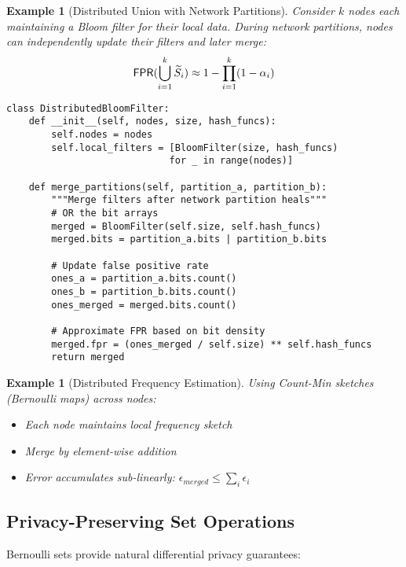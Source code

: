 \documentclass[11pt,final,hidelinks]{article}
\newtheorem{example}[theorem]{Example}
\newcommand{\ASet}[1]{\obs{#1}}  %
\begin{document}
\begin{example}[Distributed Union with Network Partitions]
Consider $k$ nodes each maintaining a Bloom filter for their local data. During network partitions, nodes can independently update their filters and later merge:
\begin{equation}
\FPR(\bigcup_{i=1}^k \ASet{S}_i) \approx 1 - \prod_{i=1}^k (1 - \fprate_i)
\end{equation}

\begin{verbatim}
class DistributedBloomFilter:
    def __init__(self, nodes, size, hash_funcs):
        self.nodes = nodes
        self.local_filters = [BloomFilter(size, hash_funcs) 
                             for _ in range(nodes)]
    
    def merge_partitions(self, partition_a, partition_b):
        """Merge filters after network partition heals"""
        # OR the bit arrays
        merged = BloomFilter(self.size, self.hash_funcs)
        merged.bits = partition_a.bits | partition_b.bits
        
        # Update false positive rate
        ones_a = partition_a.bits.count()
        ones_b = partition_b.bits.count()
        ones_merged = merged.bits.count()
        
        # Approximate FPR based on bit density
        merged.fpr = (ones_merged / self.size) ** self.hash_funcs
        return merged
\end{verbatim}
\end{example}

\begin{example}[Distributed Frequency Estimation]
Using Count-Min sketches (Bernoulli maps) across nodes:
\begin{itemize}
    \item Each node maintains local frequency sketch
    \item Merge by element-wise addition
    \item Error accumulates sub-linearly: $\epsilon_{merged} \leq \sum_i \epsilon_i$
\end{itemize}
\end{example}

\subsection{Privacy-Preserving Set Operations}

Bernoulli sets provide natural differential privacy guarantees:
\end{document}
